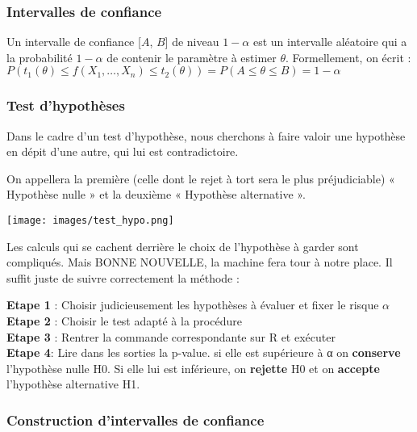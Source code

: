 \documentclass[
  letterpaper,
  DIV=11,
  numbers=noendperiod]{scrartcl}
\begin{document}
\subsubsection{Intervalles de confiance}\label{intervalles-de-confiance}

Un intervalle de confiance {[}\(A\), \(B\){]} de niveau \(1 - \alpha\)
est un intervalle aléatoire qui a la probabilité \(1 - \alpha\) de
contenir le paramètre à estimer \(\theta\). Formellement, on écrit :
\(P (t_1 (\theta) \leqslant f(X_1, \ldots, X_n) \leqslant t_2 (\theta)) = P(A \leqslant \theta \leqslant B) = 1 - \alpha\)

\newpage

\subsubsection{Test d'hypothèses}\label{test-dhypothuxe8ses}

Dans le cadre d'un test d'hypothèse, nous cherchons à faire valoir une
hypothèse en dépit d'une autre, qui lui est contradictoire.

On appellera la première (celle dont le rejet à tort sera le plus
préjudiciable) « Hypothèse nulle » et la deuxième « Hypothèse
alternative ».

\begin{center}
\texttt{[image: images/test\_hypo.png]}
\end{center}

Les calculs qui se cachent derrière le choix de l'hypothèse à garder
sont compliqués. Mais BONNE NOUVELLE, la machine fera tour à notre
place. Il suffit juste de suivre correctement la méthode :

\textbf{Etape 1} : Choisir judicieusement les hypothèses à évaluer et
fixer le risque \(𝛼\)\\
\textbf{Etape 2} : Choisir le test adapté à la procédure\\
\textbf{Etape 3} : Rentrer la commande correspondante sur R et
exécuter\\
\textbf{Etape 4}: Lire dans les sorties la p-value. si elle est
supérieure à α on \textbf{conserve} l'hypothèse nulle H0. Si elle lui
est inférieure, on \textbf{rejette} H0 et on \textbf{accepte}
l'hypothèse alternative H1.

\newpage

\subsubsection{Construction d'intervalles de
confiance}\label{construction-dintervalles-de-confiance}
\end{document}
